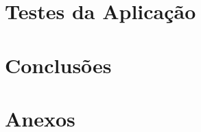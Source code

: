\documentclass{article}
\begin{document}



\pagebreak

\section{Testes da Aplicação}



\pagebreak

\section{Conclusões}


\pagebreak

\section{Anexos}
\end{document}
